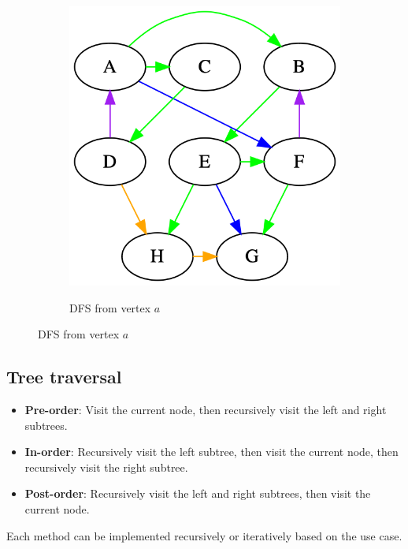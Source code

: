 \documentclass[a3paper, landscape, 11pt]{article} %
\begin{document}
\begin{multicols*}{4}
\begin{figure}[H]
\centering
  \begin{subfigure}[b]{0.45\columnwidth}
    \centering
    \includegraphics[width=1\textwidth]{images/edge-types.png}
    \label{fig:image4}
    \caption{DFS from vertex $a$}
  \end{subfigure}
\end{figure}

\hrulefill %

\subsection*{Tree traversal}
\begin{itemize}
\item \textbf{Pre-order}: Visit the current node, then recursively visit the left and right subtrees.
\item \textbf{In-order}: Recursively visit the left subtree, then visit the current node, then recursively visit the right subtree.
\item \textbf{Post-order}: Recursively visit the left and right subtrees, then visit the current node.
\end{itemize}

Each method can be implemented recursively or iteratively based on the use case.
\vfill


\end{multicols*}
\end{document}
